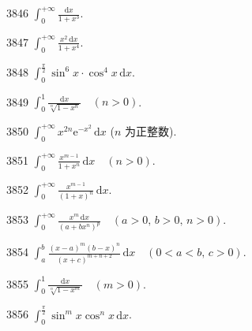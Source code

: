 \begin{prob}[S]{3846}
$\displaystyle \int_0^{+\infty} \frac{\mathrm{d}x}{1+x^3}$.
\end{prob}

\begin{prob}[S]{3847}
$\displaystyle \int_0^{+\infty} \frac{x^2\,\mathrm{d}x}{1+x^4}$.
\end{prob}

\begin{prob}[S]{3848}
$\displaystyle \int_0^{\frac{\pi}{2}} \sin^6 x \cdot \cos^4 x \,\mathrm{d}x$.
\end{prob}

\begin{prob}[S]{3849}
$\displaystyle \int_0^1 \frac{\mathrm{d}x}{\sqrt[n]{1-x^n}} \quad (n>0)$.
\end{prob}

\begin{prob}[S]{3850}
$\displaystyle \int_0^{+\infty} x^{2n}\mathrm{e}^{-x^2} \,\mathrm{d}x$ ($n$ 为正整数).
\end{prob}


\begin{prob}[S]{3851}
$\displaystyle \int_0^{+\infty} \frac{x^{m-1}}{1+x^n} \,\mathrm{d}x \quad (n>0)$.
\end{prob}

\begin{prob}[S]{3852}
$\displaystyle \int_0^{+\infty} \frac{x^{m-1}}{(1+x)^n} \,\mathrm{d}x$.
\end{prob}

\begin{prob}[S]{3853}
$\displaystyle \int_0^{+\infty} \frac{x^m\,\mathrm{d}x}{(a+bx^n)^p} \quad (a>0,\, b>0,\, n>0)$.
\end{prob}

\begin{prob}[S]{3854}
$\displaystyle \int_a^b \frac{(x-a)^m(b-x)^n}{(x+c)^{m+n+2}} \,\mathrm{d}x \quad (0<a<b,\, c>0)$.
\end{prob}

\begin{prob}[S]{3855}
$\displaystyle \int_0^1 \frac{\mathrm{d}x}{\sqrt[n]{1-x^m}} \quad (m>0)$.
\end{prob}

\begin{prob}[S]{3856}
$\displaystyle \int_0^{\frac{\pi}{2}} \sin^m x \cos^n x \,\mathrm{d}x$.
\end{prob}

